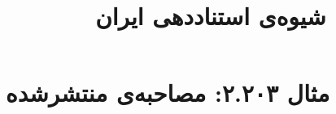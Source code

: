 \documentclass[a4paper,10pt]{article}
\begin{document}
\title{شیوه‌ی استناددهی ایران
 }
\author{}
\date{}
\maketitle



\section*{مثال ۲.۲۰۳: مصاحبه‌ی منتشرشده}

\cite{آندره1976}\\
\cite{bellor1979}\\






\end{document}
